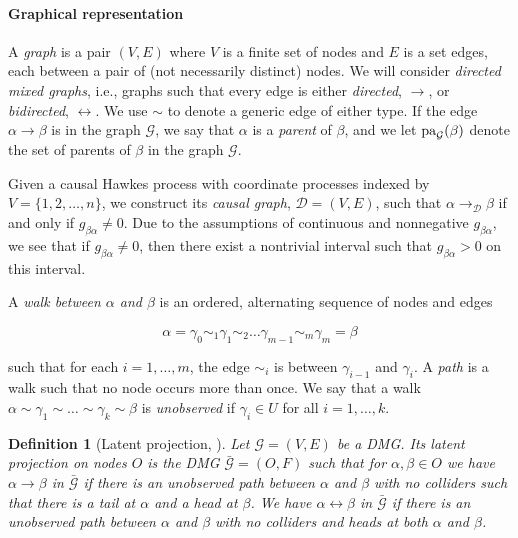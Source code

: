 \documentclass[accepted]{uai2021} %
\newtheorem{defn}[thm]{Definition}
\newcommand{\pa}{\textnormal{pa}}
\begin{document}

\paragraph{Graphical representation}

A {\it graph} is a pair $(V,E)$ where $V$ is a finite set of nodes and $E$ is a 
set edges, each between a pair of (not necessarily distinct) nodes. We will  
consider {\it directed mixed graphs}, i.e., graphs such that every edge is 
either \emph{directed}, $\rightarrow$, or \emph{bidirected}, $\leftrightarrow$. 
We use $\sim$ to denote a generic edge of either type. If the edge 
$\alpha\rightarrow\beta$ is in the graph $\mathcal{G}$, we say that $\alpha$ is 
a \emph{parent} of $\beta$, and we let $\pa_\mathcal{G}(\beta)$ denote the set 
of parents 
of $\beta$ in the graph $\mathcal{G}$.

Given a causal Hawkes process with coordinate processes indexed by $V = 
\{1,2,\ldots,n\}$, we construct its \emph{causal graph}, $\mathcal{D} = (V,E)$, 
such that 
$\alpha \rightarrow_\mathcal{D} \beta$ if and only if $g_{\beta\alpha} \neq 0$. 
Due 
to the assumptions of continuous and nonnegative $g_{\beta\alpha}$, we see 
that if $g_{\beta\alpha}\neq 0$, then there exist a nontrivial interval such 
that $g_{\beta\alpha} > 0$ on this interval.

A {\it walk between $\alpha$ and $\beta$} is an ordered, alternating sequence 
of nodes and edges

$$
\alpha = \gamma_0 \sim_1 \gamma_1 \sim_2 \ldots \gamma_{m-1} \sim_m \gamma_{m} 
= \beta
$$

such that for each $i = 1,\ldots,m$, the edge $\sim_i$ is between 
$\gamma_{i-1}$ and $\gamma_i$. A {\it path} is a walk such that no node occurs 
more than once. We say that a walk $\alpha \sim \gamma_1 \sim \ldots \sim 
\gamma_k \sim \beta$ is \emph{unobserved} if $\gamma_i \in U$ for all $i = 
1,\ldots, k$. 

\begin{defn}[Latent projection, \cite{vermaEquiAndSynthesis,richardson2017}]
	\label{def:latProj}
	Let $\mathcal{G} = (V,E)$ be a DMG. Its latent projection on nodes $O$ is 
	the DMG $\bar{\mathcal{G}} = (O,F)$ such that for $\alpha,\beta\in O$ we 
	have $\alpha\rightarrow\beta$ in $\bar{\mathcal{G}}$ if there is an 
	unobserved path between $\alpha$ and $\beta$ with no colliders such that 
	there is a tail at $\alpha$ and a head at $\beta$. We have 
	$\alpha\leftrightarrow\beta$ in $\bar{\mathcal{G}}$ if there is an 
	unobserved path between $\alpha$ and $\beta$ with no colliders and heads at 
	both $\alpha$ and $\beta$.
\end{defn}
\end{document}
